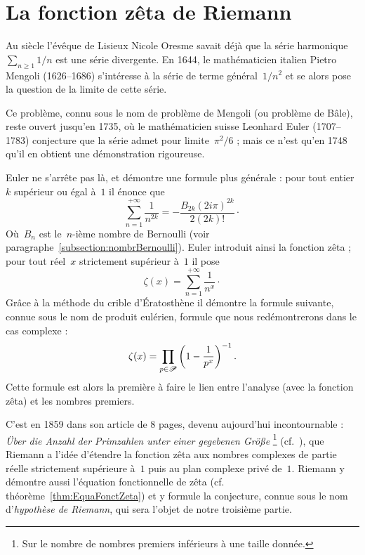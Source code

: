 \boldmath
\chapter{La fonction zêta de Riemann}	
\unboldmath
	Au  siècle l'évêque de Lisieux Nicole Oresme savait déjà que la série harmonique~$\sum_{n\geq 1} 1/n$ est une série divergente. En 1644, le mathématicien italien Pietro Mengoli (1626--1686) s'intéresse à la série de terme général~$1/n^2$ et se alors pose la question de la limite de cette série. 
		
	Ce problème, connu sous le nom de problème de Mengoli (ou problème de Bâle), reste ouvert jusqu'en 1735, où le mathématicien suisse Leonhard Euler (1707--1783) conjecture que la série admet pour limite~$\pi^2/6$ ; mais ce n'est qu'en 1748 qu'il en obtient une démonstration rigoureuse.
		
	Euler ne s'arrête pas là, et démontre une formule plus générale : pour tout entier~$k$ supérieur ou égal à~$1$ il énonce que
	\[
		\sum_{n=1}^{+\infty} \frac{1}{n^{2k}} =
			-\frac{B_{2k} (2i\pi)^{2k}}{2(2k)!}\cdot
	\]
	Où~$B_n$ est le~$n$-ième nombre de Bernoulli (voir paragraphe~\ref{subsection:nombrBernoulli}). Euler introduit ainsi la fonction zêta ; pour tout réel~$x$ strictement supérieur à~$1$ il pose
	\[
		\zeta(x) = \sum_{n=1}^{+\infty} \frac{1}{n^x}\cdot
	\]
	Grâce à la méthode du crible d'Ératosthène il démontre la formule suivante, connue sous le nom de produit eulérien, formule que nous redémontrerons dans le cas complexe :
	\[
		\zeta(x) = \prod_{p\in\mathscr{P}} \left( 1-\frac{1}{p^x} \right)^{-1}.
	\]
	Cette formule est alors la première à faire le lien entre l'analyse (avec la fonction zêta) et les nombres premiers.
	
	C'est en 1859 dans son article de 8 pages, devenu aujourd'hui incontournable : \textit{Über die Anzahl der Primzahlen unter einer gegebenen Grö\ss{}e} \footnote{Sur le nombre de nombres premiers inférieurs à une taille donnée.} (cf.~\cite{ArticRiemann}), que Riemann a l'idée d'étendre la fonction zêta aux nombres complexes de partie réelle strictement supérieure à~$1$ puis au plan complexe privé de~$1$. Riemann y démontre aussi l'équation fonctionnelle de zêta (cf. théorème~\ref{thm:EquaFonctZeta}) et y formule la conjecture, connue sous le nom d'\emph{hypothèse de Riemann}, qui sera l'objet de notre troisième partie.
	
